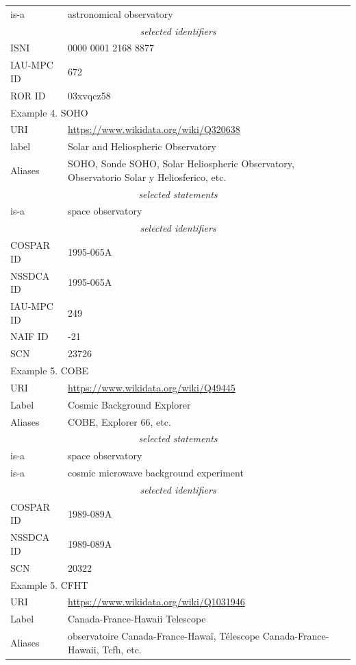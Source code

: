 \documentclass[11pt,a4paper]{ivoa}
\begin{document}
\begin{longtable}{p{}p{}}
is-a & astronomical observatory \\
\multicolumn{2}{c}{\sl selected identifiers}\\
ISNI       & 0000 0001 2168 8877\\
IAU-MPC ID & 672\\
ROR ID     & 03xvqcz58\\
\hline
\hline
\multicolumn{2}{l}{Example 4. SOHO}\\
\hline
URI & \url{https://www.wikidata.org/wiki/Q320638}\\
label      & Solar and Heliospheric Observatory\\
Aliases    & SOHO, Sonde SOHO, Solar Heliospheric Observatory, Observatorio Solar y Heliosferico, etc.\\
\multicolumn{2}{c}{\sl selected statements}\\
is-a & space observatory \\
\multicolumn{2}{c}{\sl selected identifiers}\\
COSPAR ID  & 1995-065A \\
NSSDCA ID  & 1995-065A \\
IAU-MPC ID & 249\\
NAIF ID    & -21\\
SCN        & 23726\\
\hline
\hline
\multicolumn{2}{l}{Example 5. COBE}\\
\hline
URI & \url{https://www.wikidata.org/wiki/Q49445}\\
Label      & Cosmic Background Explorer\\
Aliases    & COBE, Explorer 66, etc.\\
\multicolumn{2}{c}{\sl selected statements}\\
is-a & space observatory \\
is-a & cosmic microwave background experiment \\
\multicolumn{2}{c}{\sl selected identifiers}\\
COSPAR ID  & 1989-089A \\
NSSDCA ID  & 1989-089A \\
SCN        & 20322\\
\hline
\hline
\multicolumn{2}{l}{Example 5. CFHT}\\
\hline
URI & \url{https://www.wikidata.org/wiki/Q1031946}\\
Label      & Canada-France-Hawaii Telescope\\
Aliases    & observatoire Canada-France-Hawa\"i, T\'elescope Canada-France-Hawaii, Tcfh, etc.\\

\end{longtable}
\end{document}
